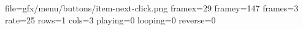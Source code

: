 file=gfx/menu/buttons/item-next-click.png
framex=29
framey=147
frames=3
rate=25
rows=1
cols=3
playing=0
looping=0
reverse=0